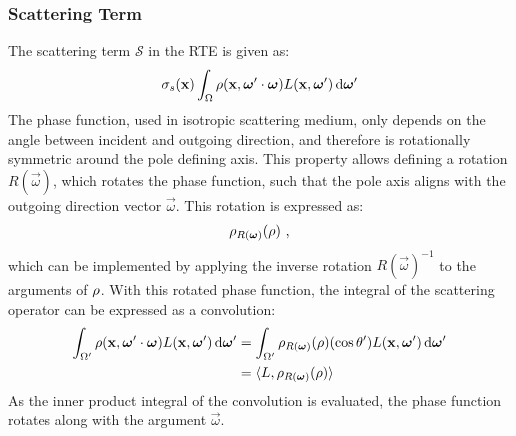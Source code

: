 \subsubsection*{Scattering Term}

The scattering term $\mathcal{S}$ in the RTE is given as:
\begin{align*}
\sigma_s(\boldsymbol{\mathbf{x}})\int_{\Omega}\rho(\boldsymbol{\mathbf{x}}, \boldsymbol{\mathbf{\omega}}'\cdot\boldsymbol{\mathbf{\omega}})L(\boldsymbol{\mathbf{x}}, \boldsymbol{\mathbf{\omega}}')\,\mathrm{d}\boldsymbol{\mathbf{\omega}}'
\end{align*}
The phase function, used in isotropic scattering medium, only depends on the angle between incident and outgoing direction, and therefore is rotationally symmetric around the pole defining axis. This property allows defining a rotation $R(\vec{\omega})$, which rotates the phase function, such that the pole axis aligns with the outgoing direction vector $\vec{\omega}$. This rotation is expressed as:
\begin{align*}
\rho_{R(\boldsymbol{\mathbf{\omega}})}(\rho)
\ ,
\end{align*}
which can be implemented by applying the inverse rotation $R(\vec{\omega})^{-1}$ to the arguments of $\rho$. With this rotated phase function, the integral of the scattering operator can be expressed as a convolution:
\begin{align}
\int_{\Omega'}\rho(\boldsymbol{\mathbf{x}}, \boldsymbol{\mathbf{\omega}}'\cdot\boldsymbol{\mathbf{\omega}})L(\boldsymbol{\mathbf{x}}, \boldsymbol{\mathbf{\omega}}')\,\mathrm{d}\boldsymbol{\mathbf{\omega}}'
&=
\int_{\Omega'}{\rho_{R(\boldsymbol{\mathbf{\omega}})}(\rho)(\operatorname{cos}\theta')L(\boldsymbol{\mathbf{x}}, \boldsymbol{\mathbf{\omega}}')\,\mathrm{d}\boldsymbol{\mathbf{\omega}}'}
\nonumber\\
&= \langle L,  \rho_{R(\boldsymbol{\mathbf{\omega}})}(\rho)\rangle
\label{eq:complex_scatt_conv}
\end{align}
As the inner product integral of the convolution is evaluated, the phase function rotates along with the argument $\vec{\omega}$.

